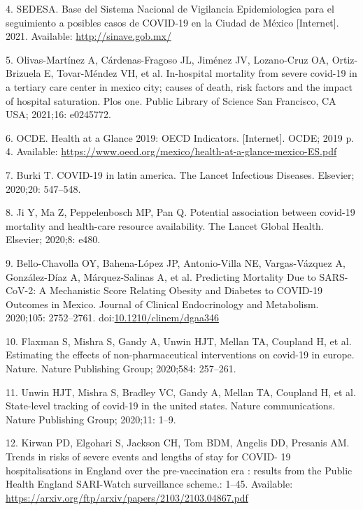 \documentclass[10pt,letterpaper]{article}
\begin{document}
\leavevmode\hypertarget{ref-SEDESA2021}{}%
4. SEDESA. Base del Sistema Nacional de Vigilancia Epidemiologica para
el seguimiento a posibles casos de COVID-19 en la Ciudad de México
{[}Internet{]}. 2021. Available: \url{http://sinave.gob.mx/}

\leavevmode\hypertarget{ref-olivas2021hospital}{}%
5. Olivas-Martínez A, Cárdenas-Fragoso JL, Jiménez JV, Lozano-Cruz OA,
Ortiz-Brizuela E, Tovar-Méndez VH, et al. In-hospital mortality from
severe covid-19 in a tertiary care center in mexico city; causes of
death, risk factors and the impact of hospital saturation. Plos one.
Public Library of Science San Francisco, CA USA; 2021;16: e0245772.

\leavevmode\hypertarget{ref-OCDE2019}{}%
6. OCDE. Health at a Glance 2019: OECD Indicators. {[}Internet{]}. OCDE;
2019 p. 4. Available:
\url{https://www.oecd.org/mexico/health-at-a-glance-mexico-ES.pdf}

\leavevmode\hypertarget{ref-burki2020covid}{}%
7. Burki T. COVID-19 in latin america. The Lancet Infectious Diseases.
Elsevier; 2020;20: 547--548.

\leavevmode\hypertarget{ref-ji2020potential}{}%
8. Ji Y, Ma Z, Peppelenbosch MP, Pan Q. Potential association between
covid-19 mortality and health-care resource availability. The Lancet
Global Health. Elsevier; 2020;8: e480.

\leavevmode\hypertarget{ref-Bello-Chavolla2020}{}%
9. Bello-Chavolla OY, Bahena-López JP, Antonio-Villa NE, Vargas-Vázquez
A, González-Díaz A, Márquez-Salinas A, et al. Predicting Mortality Due
to SARS-CoV-2: A Mechanistic Score Relating Obesity and Diabetes to
COVID-19 Outcomes in Mexico. Journal of Clinical Endocrinology and
Metabolism. 2020;105: 2752--2761.
doi:\href{https://doi.org/10.1210/clinem/dgaa346}{10.1210/clinem/dgaa346}

\leavevmode\hypertarget{ref-flaxman2020estimating}{}%
10. Flaxman S, Mishra S, Gandy A, Unwin HJT, Mellan TA, Coupland H, et
al. Estimating the effects of non-pharmaceutical interventions on
covid-19 in europe. Nature. Nature Publishing Group; 2020;584: 257--261.

\leavevmode\hypertarget{ref-unwin2020state}{}%
11. Unwin HJT, Mishra S, Bradley VC, Gandy A, Mellan TA, Coupland H, et
al. State-level tracking of covid-19 in the united states. Nature
communications. Nature Publishing Group; 2020;11: 1--9.

\leavevmode\hypertarget{ref-Kirwan}{}%
12. Kirwan PD, Elgohari S, Jackson CH, Tom BDM, Angelis DD, Presanis AM.
Trends in risks of severe events and lengths of stay for COVID- 19
hospitalisations in England over the pre-vaccination era : results from
the Public Health England SARI-Watch surveillance scheme.: 1--45.
Available: \url{https://arxiv.org/ftp/arxiv/papers/2103/2103.04867.pdf}
\end{document}
